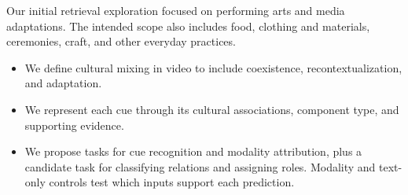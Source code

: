 Our initial retrieval exploration focused on performing arts and media adaptations.
The intended scope also includes food, clothing and materials, ceremonies, craft, and other everyday practices.

\begin{itemize}
    \item We define cultural mixing in video to include coexistence, recontextualization, and adaptation.
    \item We represent each cue through its cultural associations, component type, and supporting evidence.
    \item We propose tasks for cue recognition and modality attribution, plus a candidate task for classifying relations and assigning roles. Modality and text-only controls test which inputs support each prediction.
\end{itemize}
